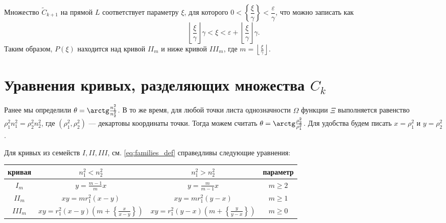 Множество $\widetilde{C}_{k+1}$ на прямой $L$ соответствует параметру $\xi$, для которого $0 <  \left\{ \dfrac{\xi }{\gamma}\right\} < \dfrac{\varepsilon}{\gamma}$, что можно записать как 
$$\left\lfloor \frac{\xi}{\gamma} \right\rfloor \gamma < \xi < \varepsilon + \left\lfloor \frac{\xi}{\gamma} \right\rfloor  \gamma.$$
Таким образом, $P(\xi)$ находится над кривой $II_m$ и ниже  кривой $III_m$, где $m=\left\lfloor \frac{\xi}{\gamma} \right\rfloor$.


\section{Уравнения кривых, разделяющих множества $C_k$}\label{sec:ch5/sec4}
Ранее мы определили $\theta = \arctg \frac{n_1^2}{n_2^2}$. В то же время, для любой точки  листа однозначности $\Omega$ функции $\Xi$ выполняется равенство $\rho_1^2 n_1^2 = \rho_2^2 n_2^2$, где $(\rho_1^2, \rho_2^2)$ --- декартовы координаты точки.
Тогда можем считать $\theta = \arctg \frac{\rho_2^2}{\rho_1^2}$. Для удобства будем писать $x = \rho_1^2$ и $y=\rho_2^2$. 

\begin{statement}
Для кривых из семейств $I, II, III$, см. \eqref{eq:families_def} справедливы следующие уравнения:
\begin{center}
\begin{tabular}{|c|c|c|c|}
\hline 
кривая &  $n_1^2 < n_2^2$  	& 	$n_1^2 > n_2^2$				& 	параметр\\ \hline 
\hline 
$I_m$ & 	$y = \frac{m-1}{m} x$  	& 	$y = \frac{m}{m-1}x $ 				&	$m \geq 2$ \\ \hline 
$II_m$ & 	$x y = m r_1^2 (x-y)$  	& 	$xy = m r_1^2(y-x) $ 		&	$m \geq 1$ \\ \hline 
$III_m$ & 	$x y = r_1^2 (x-y) \left( m + \left\{\frac{x}{x-y}\right\}\right)$  	& 	$x y = r_1^2 (y-x) \left( m + \left\{\frac{y}{y-x}\right\}\right) $ 												&	$m \geq 0$ \\ \hline 
\end{tabular}
\end{center}
\label{st:curves_formulas}
\end{statement}

